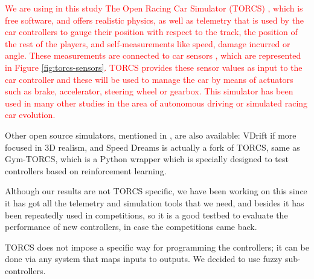 \documentclass[10pt,journal,compsoc]{IEEEtran}
\begin{document}
\textcolor{red}{
We are using in this study The Open Racing Car Simulator (TORCS) \cite{torcs4}, which is free software, and offers realistic physics, as well as telemetry that is used by the car controllers to gauge their position with respect to the track, the position of the rest of the players, and self-measurements like speed, damage incurred or angle. These measurements are connected to car sensors \cite{torcs5}, which are represented in Figure \ref{fig:torcs-sensors}. TORCS provides these sensor values as input to the car controller and these will be
used to manage the car by means of actuators such as brake, accelerator, steering wheel or gearbox. 
This simulator has been used in many other studies in the area of autonomous driving or simulated racing car evolution.}


Other open source simulators, mentioned in \cite{Loiacono:2012:LEA:2212908.2212953}, are also available: VDrift
if more focused in 3D realism, and Speed Dreams is actually a fork of
TORCS, same as Gym-TORCS, which is a Python wrapper which is specially designed to test controllers based on reinforcement learning.

Although our results are not TORCS specific, we have been
working on this since it has got all the telemetry and simulation
tools that we need, and besides it has been repeatedly used in
competitions, so it is a good testbed to evaluate the performance of new controllers, in case the competitions came back.

TORCS does not impose a specific way for programming the controllers;
it can be done via any system that maps inputs to outputs. We decided
to use fuzzy sub-controllers.

\end{document}
